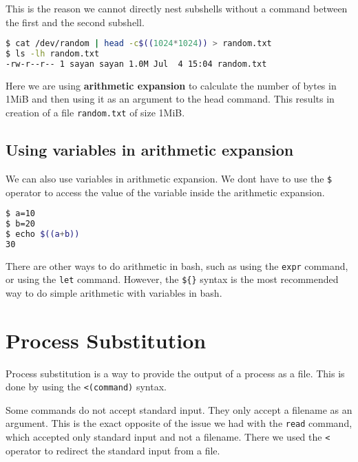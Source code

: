 This is the reason we cannot directly nest subshells without a
command between the first and the second subshell.

\begin{lstlisting}[language=bash]
$ cat /dev/random | head -c$((1024*1024)) > random.txt
$ ls -lh random.txt
-rw-r--r-- 1 sayan sayan 1.0M Jul  4 15:04 random.txt
\end{lstlisting}

Here we are using \textbf{arithmetic expansion} to calculate the
number of bytes in 1MiB
and then using it as an argument to the head command.
This results in creation of a file \texttt{random.txt} of size 1MiB.

\subsection{Using variables in arithmetic expansion}

We can also use variables in arithmetic expansion.
We dont have to use the \texttt{\$} operator to access the value of
the variable inside the arithmetic expansion.

\begin{lstlisting}[language=bash]
$ a=10
$ b=20
$ echo $((a+b))
30
\end{lstlisting}

There are other ways to do arithmetic in bash, such as using the
\texttt{expr} command, or using the \texttt{let} command. However,
the \texttt{\$\{\}} syntax is the most recommended way to do simple
arithmetic with variables in bash.

\section{Process Substitution}

Process substitution is a way to provide the output of a process
as a file. This is done by using the \texttt{<(command)} syntax.

Some commands do not accept standard input. They only accept
a filename as an argument. This is the exact opposite of the
issue we had with the \texttt{read} command, which accepted
only standard input and not a filename. There we used the
\texttt{<} operator to redirect the standard input from a file.

